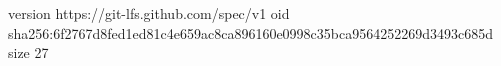 version https://git-lfs.github.com/spec/v1
oid sha256:6f2767d8fed1ed81c4e659ac8ca896160e0998c35bca9564252269d3493c685d
size 27
